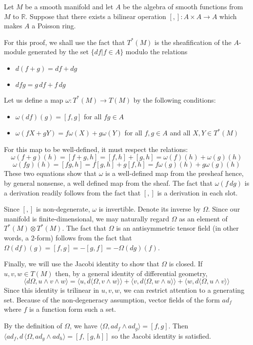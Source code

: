 \documentclass[12pt]{article}
\begin{document}
Let $M$ be a smooth manifold and let $A$ be the algebra of smooth functions from $M$ to $\mathbb{R}$.  Suppose that there exists a bilinear operation $[,] \colon A \times A \to A$ which makes $A$ a Poisson ring.

For this proof, we shall use the fact that $T^*(M)$ is the sheafification of the $A$-module generated by the set $\{ df | f \in A \}$ modulo the relations
\begin{itemize}
\item $d(f+g) = df + dg$
\item $dfg = g \, df + f \, dg$
\end{itemize}

Let us define a map $\omega \colon T^*(M) \to T(M)$ by the following conditions:
\begin{itemize}
\item $\omega (df) (g) = [f,g]$ for all $fg \in A$
\item $\omega (fX + gY) = f \omega(X) + g \omega(Y)$ for all $f,g \in A$ and all $X,Y \in T^*(M)$
\end{itemize}
For this map to be well-defined, it must respect the relations:
 $$\omega (f+g)(h) = [f+g,h] = [f,h] + [g,h] = \omega (f)(h) +  \omega (g)(h)$$
 $$\omega (fg)(h) = [fg,h] = f[g,h] + g[f,h] = f \omega (g)(h) + g \omega (g)(h)$$
These two equations show that $\omega$ is a well-defined map from the presheaf hence, by general nonsense, a well defined map from the sheaf.  The fact that $\omega (f \, dg)$ is a derivation readily follows from the fact that $[,]$ is a derivation in each slot.

Since $[,]$ is non-degenerate, $\omega$ is invertible.  Denote its inverse by $\Omega$.  Since our manifold is finite-dimensional, we may naturally regard $\Omega$ as an element of $T^*(M) \otimes T^*(M)$.  The fact that $\Omega$ is an antisymmetric tensor field (in other words, a 2-form) follows from the fact that $\Omega (df)(g) = [f,g] = -[g,f] = - \Omega (dg)(f)$.

Finally, we will use the Jacobi identity to show that $\Omega$ is
closed.  If $u,v,w \in T(M)$ then, by a general identity of
differential geometry,
 \[\langle d \Omega, u \wedge v \wedge w \rangle = \langle u, d
 \langle \Omega, v \wedge w \rangle \rangle + \langle v, d \langle
 \Omega, w \wedge u \rangle \rangle + \langle w, d \langle \Omega, u
 \wedge v \rangle \rangle\]
Since this identity is trilinear in $u,v,w$, we can restrict attention
to a generating set.  Because of the non-degeneracy assumption, vector
fields of the form $ad_f$ where $f$ is a function form such a set. 

By the definition of $\Omega$, we have $\langle \Omega, ad_f
\wedge ad_g \rangle = [f,g]$.  Then $\langle ad_f, d\,
\langle \Omega, ad_g \wedge ad_h \rangle = [f,[g,h]]$
so the Jacobi identity is satisfied.
\end{document}
